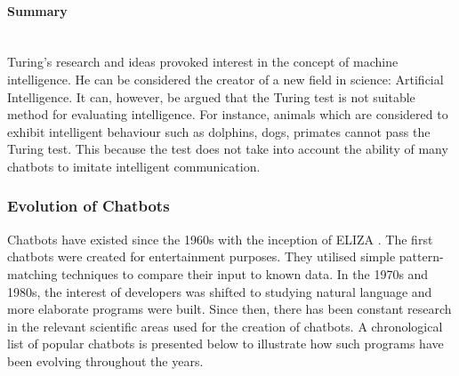 \documentclass[12pt,a4paper]{article}
\newcommand{\myparagraph}[1]{\paragraph{#1}\mbox{}\\}
\begin{document}

\myparagraph{Summary}
Turing's research and ideas provoked interest in the concept of machine intelligence. He can be considered the creator of a new field in science: Artificial Intelligence. It can, however, be argued that the Turing test is not suitable method for evaluating intelligence. For instance, animals which are considered to exhibit intelligent behaviour such as dolphins, dogs, primates cannot pass the Turing test. This because the test does not take into account the ability of many chatbots to imitate intelligent communication.

\subsubsection{Evolution of Chatbots}
Chatbots have existed since the 1960s with the inception of ELIZA \citep{Weizenbaum:1966}. The first chatbots were created for entertainment purposes. They utilised simple pattern-matching techniques to compare their input to known data. In the 1970s and 1980s, the interest of developers was shifted to studying natural language \citep{Wilensky:1988} and more elaborate programs were built. Since then, there has been constant research in the relevant scientific areas used for the creation of chatbots. A chronological list of popular chatbots is presented below to illustrate how such programs have been evolving throughout the years.
\end{document}
